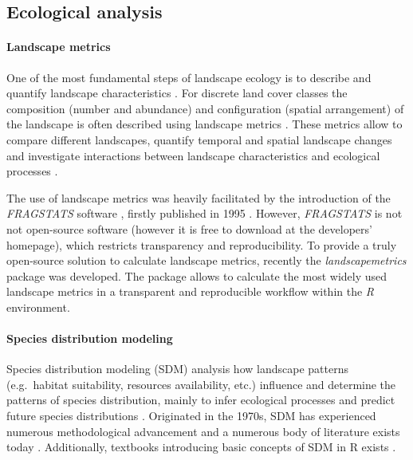 \documentclass[smallextended]{svjour3}       %
\begin{document}
\hypertarget{sec:ecological_analysis}{%
\subsection{Ecological analysis}\label{sec:ecological_analysis}}

\hypertarget{sec:landscape_metrics}{%
\paragraph{Landscape metrics}\label{sec:landscape_metrics}}

One of the most fundamental steps of landscape ecology is to describe
and quantify landscape characteristics \cite{Turner2005,Lausch2015}. For
discrete land cover classes the composition (number and abundance) and
configuration (spatial arrangement) of the landscape is often described
using landscape metrics
\cite{Gustafson1998,Uuemaa2009,Uuemaa2013,Gustafson2019}. These metrics
allow to compare different landscapes, quantify temporal and spatial
landscape changes and investigate interactions between landscape
characteristics and ecological processes \cite{Uuemaa2009}.

The use of landscape metrics was heavily facilitated by the introduction
of the \emph{FRAGSTATS} software \cite{McGarigal2012}, firstly published
in 1995 \cite{Kupfer2012,Gustafson2019}. However, \emph{FRAGSTATS} is
not not open-source software (however it is free to download at the
developers' homepage), which restricts transparency and reproducibility.
To provide a truly open-source solution to calculate landscape metrics,
recently the \emph{landscapemetrics} package \cite{Hesselbarth2019a} was
developed. The package allows to calculate the most widely used
landscape metrics in a transparent and reproducible workflow within the
\emph{R} environment.

\hypertarget{sec:SDM}{%
\paragraph{Species distribution modeling}\label{sec:SDM}}

Species distribution modeling (SDM) analysis how landscape patterns
(e.g.~habitat suitability, resources availability, etc.) influence and
determine the patterns of species distribution, mainly to infer
ecological processes and predict future species distributions
\cite{Wiersma2011}. Originated in the 1970s, SDM has experienced
numerous methodological advancement and a numerous body of literature
exists today \cite{Zimmermann2010}. Additionally, textbooks introducing
basic concepts of SDM in R exists \cite{Guisan2017,Fletcher2019}.
\end{document}
